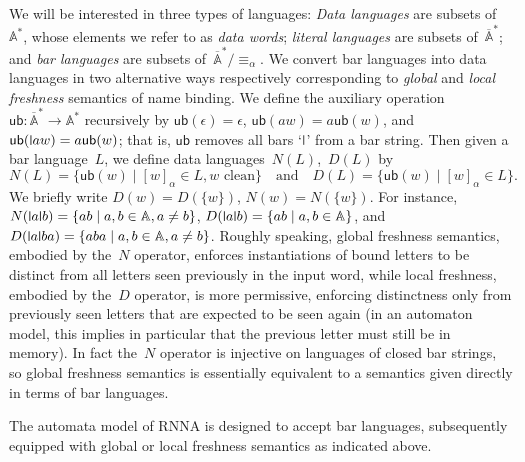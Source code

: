\documentclass[11pt,a4paper]{amsart}
\newcommand{\Names}{\mathbb{A}}
\newcommand{\barNames}{\overline{\Names}}
\newcommand{\alphaeq}{\equiv_\alpha}
\theoremstyle{plain}
\newcommand{\midmid}{\hspace{0.2ex}{\rule[-0.1ex]{0.6pt}{1.65ex}}\hspace{0.2ex}}
\newcommand{\newletter}[1]{{\midmid}#1}
\newcommand{\ub}{\mathsf{ub}}
\numberwithin{equation}{section}
\newcommand{\+}[1]{\mathcal{#1}\xspace}
\theoremstyle{definition}
\begin{document}
We will be interested in three types of languages: \emph{Data
  languages} are subsets of~$\Names^*$, whose elements we refer to as
\emph{data words}; \emph{literal languages} are subsets
of~$\barNames^*$; and \emph{bar languages} are subsets
of~$\barNames^*/{\alphaeq}$. We convert bar languages into data
languages in two alternative ways respectively corresponding to
\emph{global} and \emph{local freshness} semantics of name binding. We
define the auxiliary operation
$\ub\colon\barNames^*\to\Names^*$ recursively by
$\ub(\epsilon)=\epsilon$, $\ub(aw)=a\ub(w)$, and
$\ub(\newletter aw)=a\ub(w)$; that is, $\ub$ removes all bars
`$\newletter$' from a bar string. Then given a bar language~$L$, we
define data languages~$N(L)$,~$D(L)$ by
\begin{equation*}
  N(L)=\{\ub(w)\mid [w]_\alpha\in L, w\text{ clean}\} \quad\text{and}\quad D(L)=\{\ub(w)\mid[w]_\alpha\in L\}.
\end{equation*}
We briefly write $D(w)=D(\{w\})$, $N(w)=N(\{w\})$. For instance,
$N(\newletter a\newletter b)=\{ab\mid a,b\in\Names, a\neq b\}$,
$D(\newletter a\newletter b)=\{ab\mid a,b\in\Names\}$, and
$D(\newletter a\newletter ba)=\{aba\mid a,b\in\Names,a\neq
b\}$. Roughly speaking, global freshness semantics, embodied by
the~$N$ operator, enforces instantiations of bound letters to be
distinct from all letters seen previously in the input word, while
local freshness, embodied by the~$D$ operator, is more permissive,
enforcing distinctness only from previously seen letters that are
expected to be seen again (in an automaton model, this implies in
particular that the previous letter must still be in memory). In fact
the~$N$ operator is injective on languages of closed bar strings, so
global freshness semantics is essentially equivalent to a semantics
given directly in terms of bar languages.

The automata model of RNNA is designed to accept bar languages,
subsequently equipped with global or local freshness semantics as
indicated above.
\end{document}
